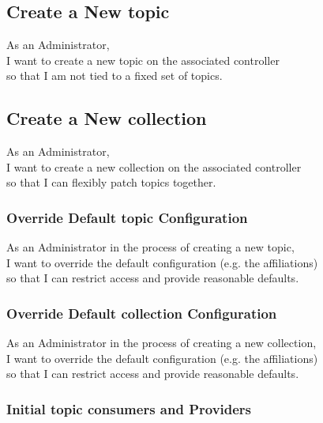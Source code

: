 \subsection{Create a New topic}\label{sec:create-topic}

As an Administrator,\\
I want to create a new topic on the associated controller\\
so that I am not tied to a fixed set of topics.

\subsection{Create a New collection}\label{sec:create-collection}

As an Administrator,\\
I want to create a new collection on the associated controller\\
so that I can flexibly patch topics together.

\subsubsection{Override Default topic Configuration}\label{sec:requirement-topic-default-configuration}

As an Administrator in the process of creating a new topic,\\
I want to override the default configuration (e.g. the affiliations) \\
so that I can restrict access and provide reasonable defaults.

\subsubsection{Override Default collection Configuration}\label{sec:requirement-collection-default-configuration}

As an Administrator in the process of creating a new collection,\\
I want to override the default configuration (e.g. the affiliations) \\
so that I can restrict access and provide reasonable defaults.

\subsubsection{Initial topic consumers and Providers}\label{sec:requirement-initial-topic-consumer-provider}


